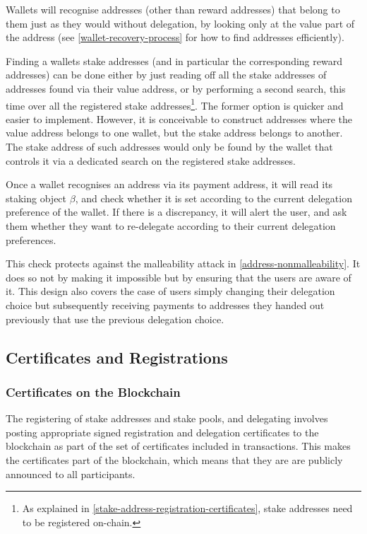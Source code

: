 \documentclass[11pt,a4paper]{article}
\begin{document}
Wallets will recognise addresses (other than reward addresses) that belong to
them just as they would without delegation, by looking only at the
value part of the address (see \cref{wallet-recovery-process} for how to find
addresses efficiently).

Finding a wallets stake addresses (and in particular the corresponding reward
addresses) can be done either by just reading off all the stake addresses of
addresses found via their value address, or by performing a second search, this
time over all the registered stake addresses\footnote{As explained in
  \cref{stake-address-registration-certificates}, stake addresses need to be
  registered on-chain.}. The former option is quicker and easier to implement.
However, it is conceivable to construct addresses where the value address
belongs to one wallet, but the stake address belongs to another. The stake
address of such addresses would only be found by the wallet that controls it via
a dedicated search on the registered stake addresses.

Once a wallet recognises an address via its payment address, it will read its
staking object \(\beta\), and check whether it is set according
to the current delegation preference of the wallet. If there is a
discrepancy, it will alert the user, and ask them whether they want to
re-delegate according to their current delegation preferences.

This check protects against the malleability attack in
\cref{address-nonmalleability}. It does so not by making it impossible but
by ensuring that the users are aware of it. This design also covers the case
of users simply changing their delegation choice but subsequently receiving
payments to addresses they handed out previously that use the previous
delegation choice.

\subsection{Certificates and Registrations}
\label{certificates-and-registrations}

\subsubsection{Certificates on the Blockchain}
\label{certificates-on-the-blockchain}

The registering of stake addresses and stake pools, and delegating
involves posting appropriate signed registration and delegation certificates to
the blockchain as part of the set of certificates included in
transactions. This makes the certificates part of
the blockchain, which means that they are are publicly announced to all
participants.
\end{document}
